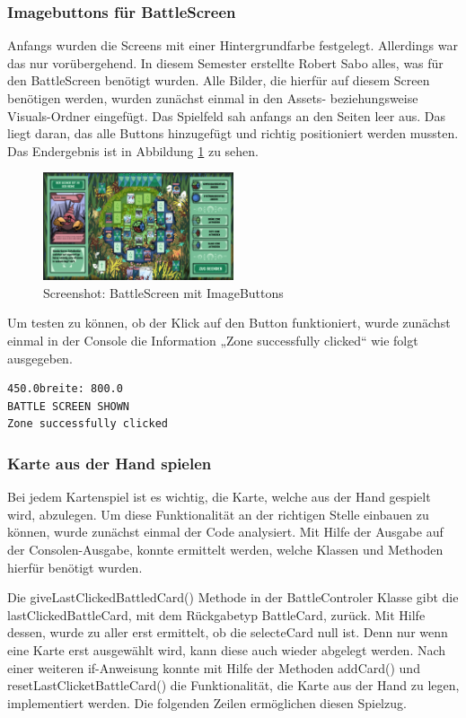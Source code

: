 \subsubsection{Imagebuttons für BattleScreen}
Anfangs wurden die Screens mit einer Hintergrundfarbe festgelegt. 
Allerdings war das nur vorübergehend. In diesem Semester erstellte Robert Sabo alles, was für den BattleScreen benötigt wurden.
Alle Bilder, die hierfür auf diesem Screen benötigen werden, wurden zunächst einmal in den Assets- beziehungsweise Visuals-Ordner eingefügt. Das Spielfeld sah anfangs an den Seiten leer aus. Das liegt daran, das alle Buttons hinzugefügt und richtig positioniert werden mussten. Das Endergebnis ist in Abbildung \ref{fig:Screenshot: BattleScreen mit ImageButtons} zu sehen.
\begin{figure}
\includegraphics[width=0.5\textwidth]{../img/screenshot_battlescreen_buttons.PNG}
\caption{Screenshot: BattleScreen mit ImageButtons}
\label{fig:Screenshot: BattleScreen mit ImageButtons}
\end{figure}
Um testen zu können, ob der Klick auf den Button funktioniert, wurde zunächst einmal in der Console die Information „Zone successfully clicked“ wie folgt ausgegeben. \\
\begin{lstlisting}
450.0breite: 800.0
BATTLE SCREEN SHOWN
Zone successfully clicked
\end{lstlisting}

\subsubsection{Karte aus der Hand spielen}
Bei jedem Kartenspiel ist es wichtig, die Karte, welche aus der Hand gespielt wird, abzulegen. Um diese Funktionalität an der richtigen Stelle einbauen zu können, wurde zunächst einmal der Code analysiert. Mit Hilfe der Ausgabe auf der Consolen-Ausgabe, konnte ermittelt werden, welche Klassen und Methoden hierfür benötigt wurden. 

Die giveLastClickedBattledCard() Methode in der BattleControler Klasse gibt die lastClickedBattleCard, mit dem Rückgabetyp BattleCard, zurück. Mit Hilfe dessen, wurde zu aller erst ermittelt, ob die selecteCard null ist. Denn nur wenn eine Karte erst ausgewählt wird, kann diese auch wieder abgelegt werden. Nach einer weiteren if-Anweisung konnte mit Hilfe der Methoden addCard() und resetLastClicketBattleCard() die Funktionalität, die Karte aus der Hand zu legen, implementiert werden. Die folgenden Zeilen ermöglichen diesen Spielzug. 

